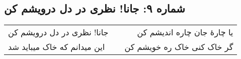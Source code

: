 \begin{center}
\section*{شماره ۹: جانا! نظری در دل درویشم کن}
\label{sec:009}
\begin{longtable}{l p{0.5cm} r}
جانا! نظری در دل درویشم کن
&&
یا چارهٔ جان چاره اندیشم کن
\\
این میدانم که خاک میباید شد
&&
گر خاک کنی خاک ره خویشم کن
\\
\end{longtable}
\end{center}
